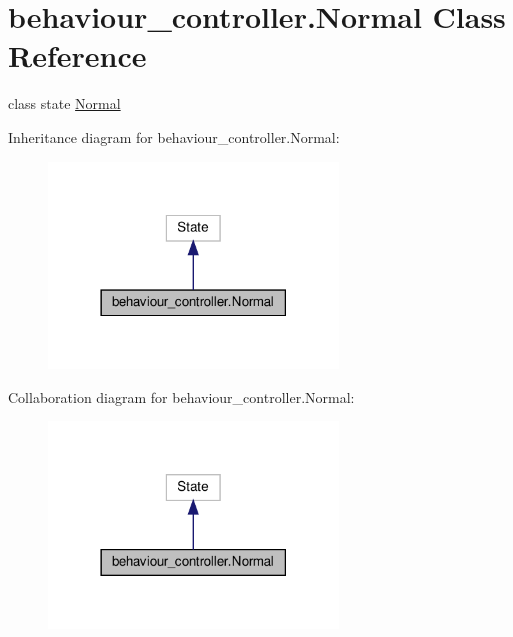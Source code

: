\hypertarget{classbehaviour__controller_1_1Normal}{}\section{behaviour\+\_\+controller.\+Normal Class Reference}
\label{classbehaviour__controller_1_1Normal}


class state \hyperlink{classbehaviour__controller_1_1Normal}{Normal}  




Inheritance diagram for behaviour\+\_\+controller.\+Normal\+:\nopagebreak
\begin{figure}[H]
\begin{center}
\leavevmode
\includegraphics[width=218pt]{classbehaviour__controller_1_1Normal__inherit__graph}
\end{center}
\end{figure}


Collaboration diagram for behaviour\+\_\+controller.\+Normal\+:\nopagebreak
\begin{figure}[H]
\begin{center}
\leavevmode
\includegraphics[width=218pt]{classbehaviour__controller_1_1Normal__coll__graph}
\end{center}
\end{figure}
